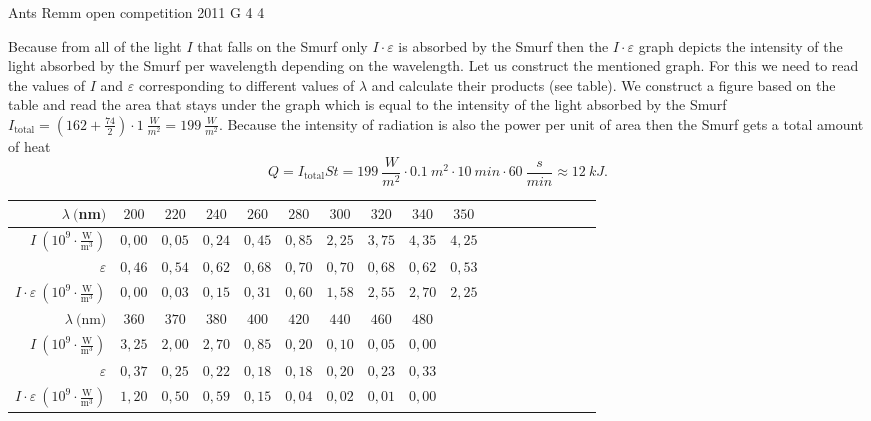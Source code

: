 \documentclass[11pt]{article}
\begin{document}
{Ants Remm} %
{open competition} %
{2011} %
{G 4} %
{4} %
{

\ifEngSolution
Because from all of the light $I$ that falls on the Smurf only $ I \cdot \varepsilon $ is absorbed by the Smurf then the $ I \cdot \varepsilon $ graph depicts the intensity of the light absorbed by the Smurf per wavelength depending on the wavelength. Let us construct the mentioned graph. For this we need to read the values of $I$ and $ \varepsilon $ corresponding to different values of $ \lambda $ and calculate their products (see table). We construct a figure based on the table and read the area that stays under the graph which is equal to the intensity of the light absorbed by the Smurf $I_{\mathrm{total}} =
(162+\frac{74}{2}) \cdot \SI{1}{\frac{W}{m^2}} = \SI{199}{\frac{W}{m^2}}$. Because the intensity of radiation is also the power per unit of area then the Smurf gets a total amount of heat
\[ Q = I_{\mathrm{total}}St =
\SI{199}{\frac{W}{m^2}} \cdot \SI{0,1}{m^2} \cdot \SI{10}{min} \cdot
\SI{60}{\frac{s}{min}} \approx \SI{12}{kJ}.\]


\begin{tabular}{r|c|c|c|c|c|c|c|c|c|c|c|c|c|c|c|c|c|}
	\hline
	$ \lambda \ ($nm$)                                               $&$ 200  $&$ 220  $&$ 240  $&$ 260  $&$ 280  $&$ 300  $&$ 320  $&$ 340  $&$ 350  $\\
	\hline
	$ I \ (10^9 \cdot \frac{\text{W}}{\text{m}^3})                   $&$ 0,00 $&$ 0,05 $&$ 0,24 $&$ 0,45 $&$ 0,85 $&$ 2,25 $&$ 3,75 $&$ 4,35 $&$ 4,25 $\\
	\hline
	$ \varepsilon                                                    $&$ 0,46 $&$ 0,54 $&$ 0,62 $&$ 0,68 $&$ 0,70 $&$ 0,70 $&$ 0,68 $&$ 0,62 $&$ 0,53 $\\
	\hline
	$ I \cdot \varepsilon \ (10^9 \cdot \frac{\text{W}}{\text{m}^3}) $&$ 0,00 $&$ 0,03 $&$ 0,15 $&$ 0,31 $&$ 0,60 $&$ 1,58 $&$ 2,55 $&$ 2,70 $&$ 2,25 $\\
	\hline
	\hline
	$ \lambda \ ($nm$)                                               $&$ 360  $&$ 370  $&$ 380  $&$ 400  $&$ 420  $&$ 440  $&$ 460  $&$ 480  $\\
	\hline
	$ I \ (10^9 \cdot \frac{\text{W}}{\text{m}^3})                   $&$ 3,25 $&$ 2,00 $&$ 2,70 $&$ 0,85 $&$ 0,20 $&$ 0,10 $&$ 0,05 $&$ 0,00 $\\
	\hline
	$ \varepsilon                                                    $&$ 0,37 $&$ 0,25 $&$ 0,22 $&$ 0,18 $&$ 0,18 $&$ 0,20 $&$ 0,23 $&$ 0,33 $\\
	\hline
	$ I \cdot \varepsilon \ (10^9 \cdot \frac{\text{W}}{\text{m}^3}) $&$ 1,20 $&$ 0,50 $&$ 0,59 $&$ 0,15 $&$ 0,04 $&$ 0,02 $&$ 0,01 $&$ 0,00 $\\ 	
\end{tabular}

}
\end{document}
